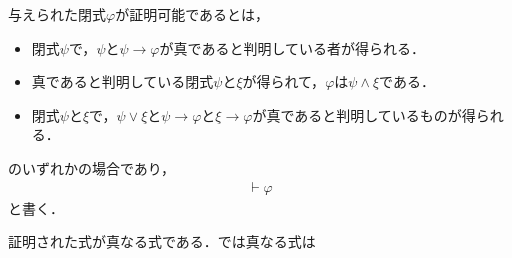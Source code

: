 \documentclass[a4j,10.5pt,oneside,openany]{jsbook}
\begin{document}
	与えられた閉式$\varphi$が証明可能であるとは，
	\begin{itemize}
		\item 閉式$\psi$で，$\psi$と$\psi \rightarrow \varphi$が真であると判明している者が得られる．
		\item 真であると判明している閉式$\psi$と$\xi$が得られて，$\varphi$は$\psi \wedge \xi$である．
		\item 閉式$\psi$と$\xi$で，$\psi \vee \xi$と$\psi \rightarrow \varphi$と$\xi \rightarrow \varphi$が真であると判明しているものが得られる．
	\end{itemize}
	
	のいずれかの場合であり，
	\begin{align}
		\vdash \varphi
	\end{align}
	と書く．
	
	証明された式が真なる式である．では真なる式は
\end{document}
